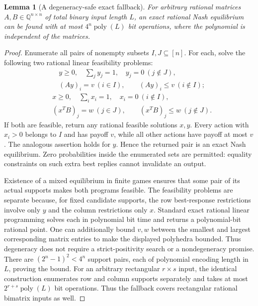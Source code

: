 \documentclass[11pt,a4paper]{article}
\newtheorem{lemma}[theorem]{Lemma}
\begin{document}
\begin{lemma}[A degeneracy-safe exact fallback]
For arbitrary rational matrices $A,B\in\mathbb Q^{n\times n}$ of total binary input length $L$, an exact rational Nash equilibrium can be found with at most $4^n\operatorname{poly}(L)$ bit operations, where the polynomial is independent of the matrices.
\end{lemma}
\begin{proof}
Enumerate all pairs of nonempty subsets $I,J\subseteq[n]$. For each, solve the following two rational linear feasibility problems:
\[
 \begin{split}
 &y\geq0,\quad\sum_jy_j=1,\quad y_j=0\ (j\notin J),\\
 &(Ay)_i=v\ (i\in I),\qquad (Ay)_i\leq v\ (i\notin I);
 \end{split}
\]
\[
 \begin{split}
 &x\geq0,\quad\sum_ix_i=1,\quad x_i=0\ (i\notin I),\\
 &(x^TB)_j=w\ (j\in J),\qquad(x^TB)_j\leq w\ (j\notin J).
 \end{split}
\]
If both are feasible, return any rational feasible solutions $x,y$. Every action with $x_i>0$ belongs to $I$ and has payoff $v$, while all other actions have payoff at most $v$. The analogous assertion holds for $y$. Hence the returned pair is an exact Nash equilibrium. Zero probabilities inside the enumerated sets are permitted: equality constraints on such extra best replies cannot invalidate an output.

Existence of a mixed equilibrium in finite games ensures that some pair of its actual supports makes both programs feasible. The feasibility problems are separate because, for fixed candidate supports, the row best-response restrictions involve only $y$ and the column restrictions only $x$. Standard exact rational linear programming solves each in polynomial bit time and returns a polynomial-bit rational point. One can additionally bound $v,w$ between the smallest and largest corresponding matrix entries to make the displayed polyhedra bounded. Thus degeneracy does not require a strict-positivity search or a nondegeneracy promise.
There are $(2^n-1)^2<4^n$ support pairs, each of polynomial encoding length in $L$, proving the bound. For an arbitrary rectangular $r\times s$ input, the identical construction enumerates row and column supports separately and takes at most $2^{r+s}\operatorname{poly}(L)$ bit operations. Thus the fallback covers rectangular rational bimatrix inputs as well.
\end{proof}
\end{document}
